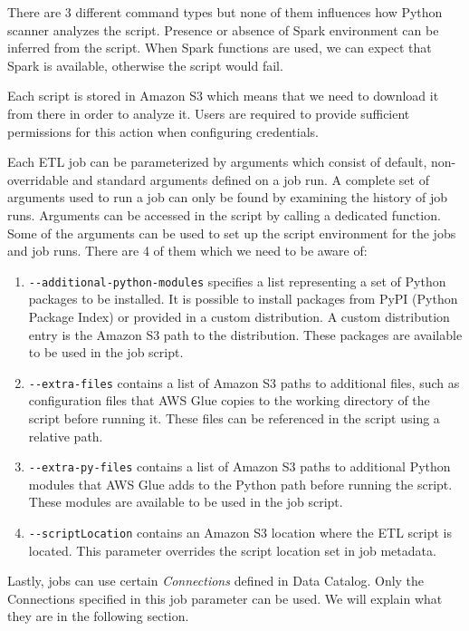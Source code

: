 \par
There are 3 different command types but none of them influences how Python scanner analyzes the script. Presence or absence of Spark environment can be inferred from the script. When Spark functions are used, we can expect that Spark is available, otherwise the script would fail.
\par
Each script is stored in Amazon S3 which means that we need to download it from there in order to analyze it. Users are required to provide sufficient permissions for this action when configuring credentials.
\par
Each ETL job can be parameterized by arguments which consist of default, non-overridable and standard arguments defined on a job run. A complete set of arguments used to run a job can only be found by examining the history of job runs. Arguments can be accessed in the script by calling a dedicated function. Some of the arguments can be used to set up the script environment for the jobs and job runs. There are 4 of them which we need to be aware of:
\begin{enumerate}
    \item \texttt{-{}-additional-python-modules} specifies a list representing a set of Python packages to be installed. It is possible to install packages from PyPI (Python Package Index) or provided in a custom distribution. A custom distribution entry is the Amazon S3 path to the distribution. These packages are available to be used in the job script.
    \item \texttt{-{}-extra-files} contains a list of Amazon S3 paths to additional files, such as configuration files that AWS Glue copies to the working directory of the script before running it. These files can be referenced in the script using a relative path.
    \item \texttt{-{}-extra-py-files} contains a list of Amazon S3 paths to additional Python modules that AWS Glue adds to the Python path before running the script. These modules are available to be used in the job script.
    \item \texttt{-{}-scriptLocation} contains an Amazon S3 location where the ETL script is located. This parameter overrides the script location set in job metadata.
\end{enumerate}
\par
Lastly, jobs can use certain \textit{Connections} defined in Data Catalog. Only the Connections specified in this job parameter can be used. We will explain what they are in the following section.

